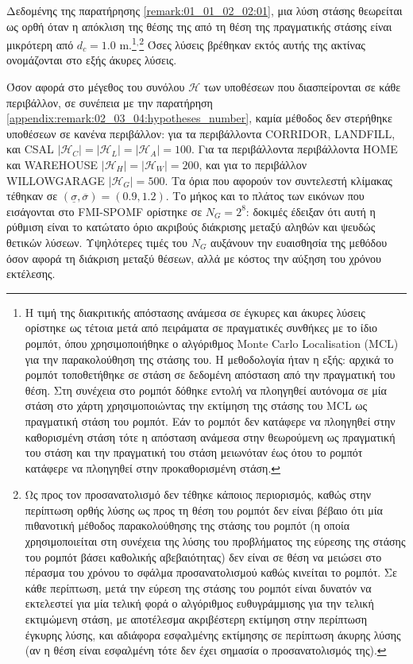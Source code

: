 Δεδομένης της παρατήρησης \ref{remark:01_01_02_02:01}, μια λύση στάσης
θεωρείται ως ορθή όταν η απόκλιση της θέσης της από τη θέση της πραγματικής
στάσης είναι μικρότερη από $d_c = 1.0$ m.\footnote{Η τιμή της διακριτικής
απόστασης ανάμεσα σε έγκυρες και άκυρες λύσεις ορίστηκε ως τέτοια μετά από
πειράματα σε πραγματικές συνθήκες με το ίδιο ρομπότ, όπου χρησιμοποιήθηκε ο
αλγόριθμος Monte Carlo Localisation (MCL) για την παρακολούθηση της στάσης του.
Η μεθοδολογία ήταν η εξής: αρχικά το ρομπότ τοποθετήθηκε σε στάση σε δεδομένη
απόσταση από την πραγματική του θέση. Στη συνέχεια στο ρομπότ δόθηκε εντολή να
πλοηγηθεί αυτόνομα σε μία στάση στο χάρτη χρησιμοποιώντας την εκτίμηση της
στάσης του MCL ως πραγματική στάση του ρομπότ. Εάν το ρομπότ δεν κατάφερε να
πλοηγηθεί στην καθορισμένη στάση τότε η απόσταση ανάμεσα στην θεωρούμενη ως
πραγματική του στάση και την πραγματική του στάση μειωνόταν έως ότου το ρομπότ
κατάφερε να πλοηγηθεί στην προκαθορισμένη στάση.}$^,$\footnote{Ως προς τον
προσανατολισμό δεν τέθηκε κάποιος περιορισμός, καθώς στην περίπτωση ορθής λύσης
ως προς τη θέση του ρομπότ δεν είναι βέβαιο ότι μία πιθανοτική μέθοδος
παρακολούθησης της στάσης του ρομπότ (η οποία χρησιμοποιείται στη συνέχεια της
λύσης του προβλήματος της εύρεσης της στάσης του ρομπότ βάσει καθολικής
αβεβαιότητας) δεν είναι σε θέση να μειώσει στο πέρασμα του χρόνου το σφάλμα
προσανατολισμού καθώς κινείται το ρομπότ. Σε κάθε περίπτωση, μετά την εύρεση
της στάσης του ρομπότ είναι δυνατόν να εκτελεστεί για μία τελική φορά ο
αλγόριθμος ευθυγράμμισης για την τελική εκτιμώμενη στάση, με αποτέλεσμα
ακριβέστερη εκτίμηση στην περίπτωση έγκυρης λύσης, και αδιάφορα εσφαλμένης
εκτίμησης σε περίπτωση άκυρης λύσης (αν η θέση είναι εσφαλμένη τότε δεν έχει
σημασία ο προσανατολισμός της).} Όσες λύσεις βρέθηκαν εκτός αυτής της ακτίνας
ονομάζονται στο εξής άκυρες λύσεις.

Όσον αφορά στο μέγεθος του συνόλου $\mathcal{H}$ των υποθέσεων που
διασπείρονται σε κάθε περιβάλλον, σε συνέπεια με την παρατήρηση
\ref{appendix:remark:02_03_04:hypotheses_number}, καμία μέθοδος δεν στερήθηκε
υποθέσεων σε κανένα περιβάλλον: για τα περιβάλλοντα CORRIDOR, LANDFILL, και
CSAL $|\mathcal{H}_C| = |\mathcal{H}_L| = |\mathcal{H}_A| = 100$. Για τα
περιβάλλοντα περιβάλλοντα HOME και WAREHOUSE $|\mathcal{H}_H| = |\mathcal{H}_W|
= 200$, και για το περιβάλλον WILLOWGARAGE $|\mathcal{H}_G| = 500$.  Τα όρια
που αφορούν τον συντελεστή κλίμακας τέθηκαν σε $(\underline{\sigma},
\overline{\sigma}) = (0.9, 1.2)$. Το μήκος και το πλάτος των εικόνων που
εισάγονται στο FMI-SPOMF ορίστηκε σε $N_G = 2^8$: δοκιμές έδειξαν ότι αυτή η
ρύθμιση είναι το κατώτατο όριο ακριβούς διάκρισης μεταξύ αληθών και ψευδώς
θετικών λύσεων. Υψηλότερες τιμές του $N_G$ αυξάνουν την ευαισθησία της μεθόδου
όσον αφορά τη διάκριση μεταξύ θέσεων, αλλά με κόστος την αύξηση του χρόνου
εκτέλεσης.

